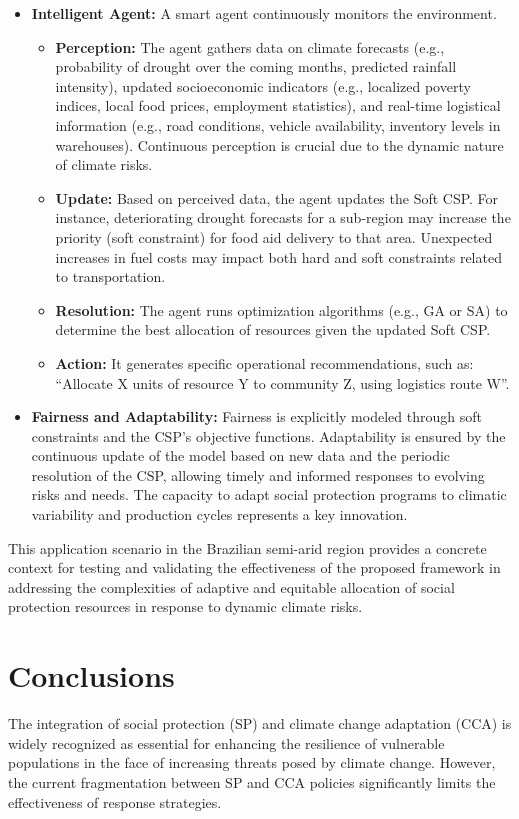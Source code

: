 \begin{itemize}
    \item \textbf{Intelligent Agent:} A smart agent continuously monitors the environment.
    \begin{itemize}
        \item \textbf{Perception:} The agent gathers data on climate forecasts (e.g., probability of drought over the coming months, predicted rainfall intensity), updated socioeconomic indicators (e.g., localized poverty indices, local food prices, employment statistics), and real-time logistical information (e.g., road conditions, vehicle availability, inventory levels in warehouses). Continuous perception is crucial due to the dynamic nature of climate risks.
        \item \textbf{Update:} Based on perceived data, the agent updates the Soft CSP. For instance, deteriorating drought forecasts for a sub-region may increase the priority (soft constraint) for food aid delivery to that area. Unexpected increases in fuel costs may impact both hard and soft constraints related to transportation.
        \item \textbf{Resolution:} The agent runs optimization algorithms (e.g., GA or SA) to determine the best allocation of resources given the updated Soft CSP.
        \item \textbf{Action:} It generates specific operational recommendations, such as: ``Allocate X units of resource Y to community Z, using logistics route W''.
    \end{itemize}

    \item \textbf{Fairness and Adaptability:} Fairness is explicitly modeled through soft constraints and the CSP’s objective functions. Adaptability is ensured by the continuous update of the model based on new data and the periodic resolution of the CSP, allowing timely and informed responses to evolving risks and needs. The capacity to adapt social protection programs to climatic variability and production cycles represents a key innovation.
\end{itemize}

This application scenario in the Brazilian semi-arid region provides a concrete context for testing and validating the effectiveness of the proposed framework in addressing the complexities of adaptive and equitable allocation of social protection resources in response to dynamic climate risks.

\section{Conclusions}
The integration of social protection (SP) and climate change adaptation (CCA) is widely recognized as essential for enhancing the resilience of vulnerable populations in the face of increasing threats posed by climate change. However, the current fragmentation between SP and CCA policies significantly limits the effectiveness of response strategies.

